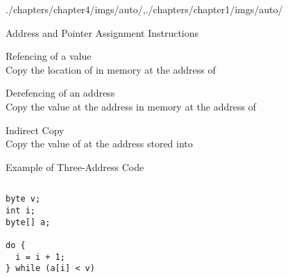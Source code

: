 \begin{graphicspathcontext}{{./chapters/chapter4/imgs/auto/},{./chapters/chapter1/imgs/auto/}}
\begin{bibunit}[apalike]
\begin{frame}{{Address and Pointer} Assignment Instructions}
	\begin{definitionblock}{Refencing of a value}
		\emph{} \\
		Copy the location of  in memory at the address of 
	\end{definitionblock}
	\vspace{.5cm}
	\begin{definitionblock}{Derefencing of an address}
		\emph{} \\
		Copy the value at the address  in memory at the address of 
	\end{definitionblock}
	\vspace{.5cm}
	\begin{definitionblock}{Indirect Copy}
		\emph{} \\
		Copy the value of  at the address stored into 
	\end{definitionblock}
\end{frame}

\begin{frame}[fragile,background=6]{Example of Three-Address Code}
	\larger\larger
	\begin{columns}
		\begin{column}{.3\linewidth}
			\centering
			\begin{lstlisting}[style=lststyle-java,basicstyle=\normalsize]
byte v;
int i;
byte[] a;

do {
  i = i + 1;
} while (a[i] < v)
			\end{lstlisting}
		\end{column}
		\begin{column}{.1\linewidth}
			\centering
		\end{column}
		\begin{column}{.6\linewidth}
			\begin{tac}[.7\linewidth]
			\end{tac}
		\end{column}
	\end{columns}
\end{frame}


\end{bibunit}
\end{graphicspathcontext}
